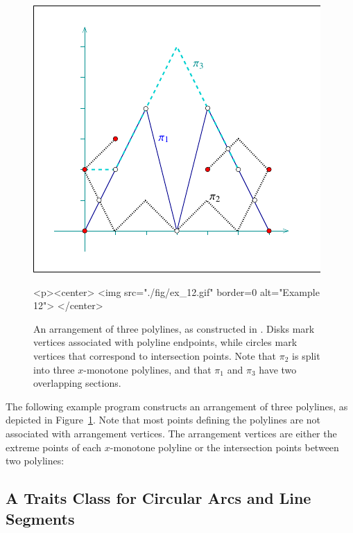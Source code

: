 \begin{figure}[t]
\begin{ccTexOnly}
  \begin{center}
  \includegraphics{Arrangement_2/fig/ex_12}
  \end{center}
\end{ccTexOnly}
\begin{ccHtmlOnly}
  <p><center>
  <img src="./fig/ex_12.gif" border=0 alt="Example 12">
  </center>
\end{ccHtmlOnly}
\caption{An arrangement of three polylines, as constructed in
. Disks mark vertices associated with
polyline endpoints, while circles mark vertices that correspond
to intersection points. Note that $\pi_2$ is split into three
$x$-monotone polylines, and that $\pi_1$ and $\pi_3$ have two
overlapping sections.}
\label{arr_fig:ex_12}
\end{figure}

The following example program constructs an arrangement of three
polylines, as depicted in Figure~\ref{arr_fig:ex_12}. Note that
most points defining the polylines are not associated with arrangement
vertices. The arrangement vertices are either the extreme points of
each $x$-monotone polyline or the intersection points between two
polylines:


\subsection{A Traits Class for Circular Arcs and Line Segments}
\label{arr_ssec:tr_circ_seg}

